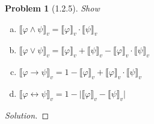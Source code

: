 \documentclass[letter]{article}
\newtheorem{problem}{Problem}
\theoremstyle{definition}
\newenvironment{solution}
{\begin{proof}[Solution]}
	{\end{proof}}
\renewcommand{\phi}{\varphi}
\begin{document}
 
\newcommand{\den}[1]{\llbracket #1 \rrbracket_v}
\begin{problem}[1.2.5]
    Show
 \begin{enumerate}[(a)]
     \item $\den{\phi \land \psi} = \den{\phi} \cdot \den{\psi}$
     \item $\den{\phi \lor \psi} = \den{\phi} + \den{\psi} - \den{\phi} \cdot \den\psi$
     \item $\den{\phi \to \psi} = 1 - \den{\phi} + \den{\phi} \cdot \den{\psi}$
     \item $\den{\phi \leftrightarrow \psi} = 1 - \big|
     \den{\phi} - \den{\psi} \big|$
 \end{enumerate}
\end{problem}
\begin{solution}
    
\end{solution}
\end{document}
